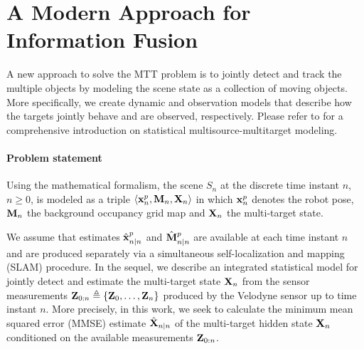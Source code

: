 \documentclass[letterpaper]{article}
\begin{document}
\section{A Modern Approach for Information Fusion}
\label{sec:a modern approach}
A new approach to solve the MTT problem is to jointly detect and track the multiple objects by modeling the scene state as a collection of moving objects. More specifically, we create dynamic and observation models that describe how the targets jointly behave and are observed, respectively. Please refer to \cite{Mahler07} for a comprehensive introduction on statistical multisource-multitarget modeling.

\paragraph{Problem statement} Using the mathematical formalism, the scene $ S_{n} $ at the discrete time instant $ n $, $ n \ge 0 $, is modeled as a triple $ \langle {\bf x}^{p}_{n}, {\bf M}_{n}, {\bf X}_{n} \rangle $ in which $ {\bf x}^{p}_{n} $ denotes the robot pose, $ {\bf M}_{n} $ the background occupancy grid map and $ {\bf X}_{n} $ the multi-target state.

We assume that estimates $ \hat{\bf x}^{p}_{n|n} $ and $ \hat{\bf M}^{p}_{n|n} $ are available at each time instant $ n $ and are produced separately via a simultaneous self-localization and mapping (SLAM) procedure. In the sequel, we describe an integrated statistical model for jointly detect and estimate the multi-target state $ {\bf X}_{n} $ from the sensor measurements $ {\bf Z}_{0:n} \triangleq \lbrace {\bf Z}_{0},\ldots, {\bf Z}_{n} \rbrace $ produced by the Velodyne sensor up to time instant $ n $. More precisely, in this work, we seek to calculate the minimum mean squared error (MMSE) estimate $ \hat{\bf X}_{n|n} $ of the multi-target hidden state $ {\bf X}_{n} $ conditioned on the available measurements $ {\bf Z}_{0:n} $.
\end{document}
